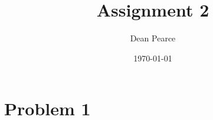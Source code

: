 \documentclass[titlepage]{scrartcl}
\title{Assignment 2}
\date{\today}
\author{Dean Pearce}
\begin{document}
\maketitle
\section{Problem 1}

\section{}
\end{document}
